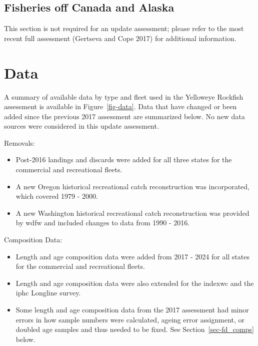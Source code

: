 \documentclass[
  english,
]{article}
\providecommand{\tightlist}{%
  \setlength{\itemsep}{0pt}\setlength{\parskip}{0pt}}
\begin{document}
\subsection{Fisheries off Canada and
Alaska}\label{fisheries-off-canada-and-alaska}

This section is not required for an update assessment; please refer to
the most recent full assessment (Gertseva and Cope 2017) for additional
information.

\newpage{}

\section{Data}\label{sec-data}

A summary of available data by type and fleet used in the Yelloweye
Rockfish assessment is available in Figure~\ref{fig-data}. Data that
have changed or been added since the previous 2017 assessment are
summarized below. No new data sources were considered in this update
assessment.

Removals:

\begin{itemize}
\tightlist
\item
  Post-2016 landings and discards were added for all three states for
  the commercial and recreational fleets.
\item
  A new Oregon historical recreational catch reconstruction was
  incorporated, which covered 1979 - 2000.
\item
  A new Washington historical recreational catch reconstruction was
  provided by \gls{wdfw} and included changes to data from 1990 - 2016.
\end{itemize}

Composition Data:

\begin{itemize}
\tightlist
\item
  Length and age composition data were added from 2017 - 2024 for all
  states for the commercial and recreational fleets.
\item
  Length and age composition data were also extended for the
  \gls{indexwc} and the \gls{iphc} Longline survey.
\item
  Some length and age composition data from the 2017 assessment had
  minor errors in how sample numbers were calculated, ageing error
  assignment, or doubled age samples and thus needed to be fixed. See
  Section~\ref{sec-fd_comps} below.
\end{itemize}
\end{document}
